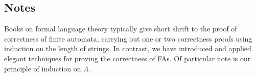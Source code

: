 \subsection{Notes}

Books on formal language theory typically give short shrift to the
proof of correctness of finite automata, carrying out one or two
correctness proofs using induction on the length of strings.  In
contrast, we have introduced and applied elegant techniques for
proving the correctness of FAs.  Of particular note is our principle
of induction on $\Lambda$.

